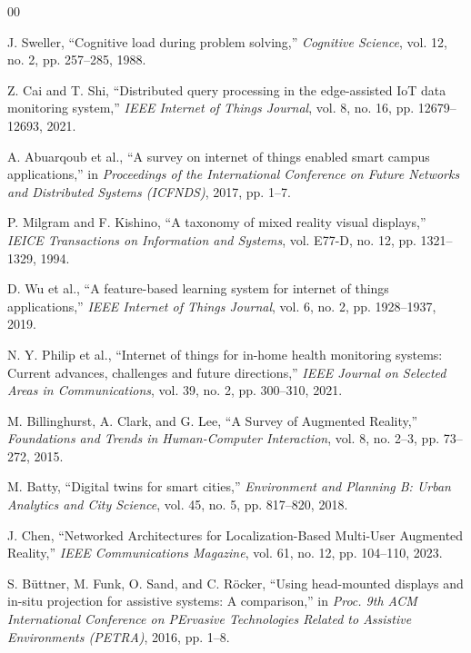 \documentclass[conference]{IEEEtran}
\begin{document}
\begin{thebibliography}{00}

 J. Sweller, ``Cognitive load during problem solving,'' \textit{Cognitive Science}, vol. 12, no. 2, pp. 257--285, 1988.

 Z. Cai and T. Shi, ``Distributed query processing in the edge-assisted IoT data monitoring system,'' \textit{IEEE Internet of Things Journal}, vol. 8, no. 16, pp. 12679--12693, 2021.

 A. Abuarqoub et al., ``A survey on internet of things enabled smart campus applications,'' in \textit{Proceedings of the International Conference on Future Networks and Distributed Systems (ICFNDS)}, 2017, pp. 1--7.

 P. Milgram and F. Kishino, ``A taxonomy of mixed reality visual displays,'' \textit{IEICE Transactions on Information and Systems}, vol. E77-D, no. 12, pp. 1321--1329, 1994.

 D. Wu et al., ``A feature-based learning system for internet of things applications,'' \textit{IEEE Internet of Things Journal}, vol. 6, no. 2, pp. 1928--1937, 2019.

 N. Y. Philip et al., ``Internet of things for in-home health monitoring systems: Current advances, challenges and future directions,'' \textit{IEEE Journal on Selected Areas in Communications}, vol. 39, no. 2, pp. 300--310, 2021.

 M. Billinghurst, A. Clark, and G. Lee, ``A Survey of Augmented Reality,'' \textit{Foundations and Trends in Human-Computer Interaction}, vol. 8, no. 2--3, pp. 73--272, 2015.

 M. Batty, ``Digital twins for smart cities,'' \textit{Environment and Planning B: Urban Analytics and City Science}, vol. 45, no. 5, pp. 817--820, 2018.

 J. Chen, ``Networked Architectures for Localization-Based Multi-User Augmented Reality,'' \textit{IEEE Communications Magazine}, vol. 61, no. 12, pp. 104--110, 2023.

 S. B\"{u}ttner, M. Funk, O. Sand, and C. R\"{o}cker, ``Using head-mounted displays and in-situ projection for assistive systems: A comparison,'' in \textit{Proc. 9th ACM International Conference on PErvasive Technologies Related to Assistive Environments (PETRA)}, 2016, pp. 1--8.


\end{thebibliography}
\end{document}
